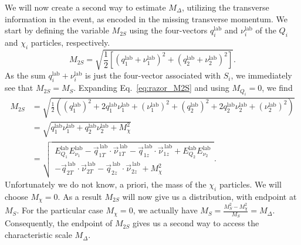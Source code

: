 We will now create a second way to estimate $M_\Delta$, utilizing the transverse information in the
event, as encoded in the missing transverse momentum. We start by defining the variable $M_{2S}$
using the four-vectors $q_i^{\textrm{lab}}$ and $\nu_i^{\textrm{lab}}$ of the $Q_i$ and $\chi_i$
particles, respectively.
\begin{equation}
  M_{2S} = \sqrt{\frac{1}{2} \left[  (q_1^{\textrm{lab}} + \nu_1^{\textrm{lab}})^2 +
(q_2^{\textrm{lab}} + \nu_2^{\textrm{lab}})^2 \right] } . \label{eq:razor_M2S}
\end{equation}
As the sum $q_i^{\textrm{lab}} + \nu_i^{\textrm{lab}}$ is just the four-vector associated with
$S_i$, we immediately see that $M_{2S} = M_S$. Expanding Eq.~\ref{eq:razor_M2S} and using $M_{Q_i}
= 0$, we find
\begin{align}
  M_{2S} &= \sqrt{\frac{1}{2} \left( (q_1^{\textrm{lab}})^2 + 2 q_1^{\textrm{lab}}
\nu_1^{\textrm{lab}} + (\nu_1^{\textrm{lab}})^2 + (q_2^{\textrm{lab}})^2 + 2 q_2^{\textrm{lab}}
\nu_2^{\textrm{lab}} + (\nu_2^{\textrm{lab}})^2\right) } \\
         &= \sqrt{ q_1^{\textrm{lab}}\nu_1^{\textrm{lab}} + q_2^{\textrm{lab}}\nu_2^{\textrm{lab}}
+ M_\chi^2} \\
         &= \sqrt{ \begin{multlined}
         E^{\textrm{lab}}_{Q_1} E^{\textrm{lab}}_{\nu_1} -
\vec{q}^{\,\textrm{lab}}_{1T}
\cdot \vec{\nu}^{\,\textrm{lab}}_{1T} - \vec{q}^{\,\textrm{lab}}_{1z} \cdot
\vec{\nu}^{\,\textrm{lab}}_{1z} 
                  + E^{\textrm{lab}}_{Q_2} E^{\textrm{lab}}_{\nu_2} \\ -
\vec{q}^{\,\textrm{lab}}_{2T}
\cdot \vec{\nu}^{\,\textrm{lab}}_{2T} - \vec{q}^{\,\textrm{lab}}_{2z} \cdot
\vec{\nu}^{\,\textrm{lab}}_{2z} + M_\chi^2 \end{multlined}}  .
\end{align}
Unfortunately we do not know, a priori, the mass of the $\chi_i$ particles. We will choose
$M_\chi =
0$. As a result $M_{2S}$ will now give us a distribution, with endpoint at $M_S$. For the
particular case $M_\chi = 0$, we actually have $M_S = \frac{M_S^2-M_\chi^2}{M_S} = M_\Delta$.
Consequently, the endpoint of $M_{2S}$ gives us a second way to access the characteristic scale
$M_\Delta$.

